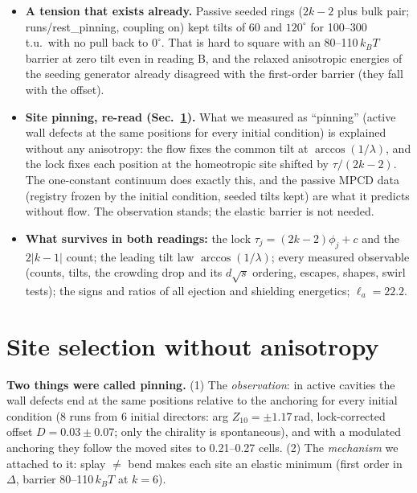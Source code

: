\documentclass[11pt,a4paper]{article}
\newcommand{\kT}{k_BT}\newcommand{\half}{\tfrac12}\newcommand{\la}{\ell_a}
\begin{document}
\begin{itemize}
stand (anisotropy-dependent ones grow by about 12\%), but the anisotropy must be described as a property of the flow-coupled algorithm, not as bare
elasticity.
\item \textbf{A tension that exists already.} Passive seeded rings ($2k-2$ plus bulk pair; runs/rest\_pinning, coupling on) kept tilts of 60 and
$120^\circ$ for 100--300\,t.u.\ with no pull back to $0^\circ$. That is hard to square with an 80--110\,$\kT$ barrier at zero tilt even in reading B,
and the relaxed anisotropic energies of the seeding generator already disagreed with the first-order barrier (they fall with the offset).
\item \textbf{Site pinning, re-read (Sec.~\ref{sec:sites}).} What we measured as ``pinning'' (active wall defects at the same positions for every
initial condition) is explained without any anisotropy: the flow fixes the common tilt at $\arccos(1/\lambda)$, and the lock fixes each position
at the homeotropic site shifted by $\tau/(2k-2)$. The one-constant continuum does exactly this, and the passive MPCD data (registry frozen by the
initial condition, seeded tilts kept) are what it predicts without flow. The observation stands; the elastic barrier is not needed.
\item \textbf{What survives in both readings:} the lock $\tau_j=(2k-2)\phi_j+c$ and the $2|k-1|$ count; the leading tilt law $\arccos(1/\lambda)$; every
measured observable (counts, tilts, the crowding drop and its $d\sqrt s$ ordering, escapes, shapes, swirl tests); the signs and ratios of all ejection
and shielding energetics; $\la=22.2$.
\end{itemize}

\section{Site selection without anisotropy}\label{sec:sites}
\textbf{Two things were called pinning.} (1) The \emph{observation}: in active cavities the wall defects end at the same positions relative to the
anchoring for every initial condition (8 runs from 6 initial directors: arg $Z_{10}=\pm1.17$\,rad, lock-corrected offset $D=0.03\pm0.07$; only the
chirality is spontaneous), and with a modulated anchoring they follow the moved sites to 0.21--0.27 cells. (2) The \emph{mechanism} we attached to it:
splay $\neq$ bend makes each site an elastic minimum (first order in $\Delta$, barrier 80--110\,$\kT$ at $k=6$).
\end{document}

